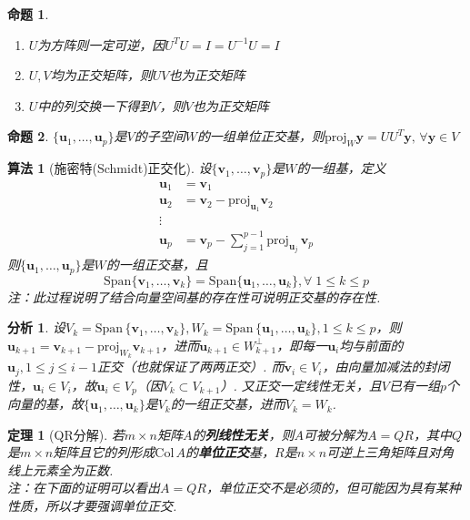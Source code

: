 \documentclass[11pt,UTF8]{ctexart}
\newtheorem{theorem}{定理}
\newtheorem{algorithm}{算法}
\newtheorem{proposition}{命题}
\newtheorem*{analysis}{分析}
\def\vy{\mathbf{y}}
\def\vv{\mathbf{v}}
\def\span{\mathrm{Span}\,}
\def\col{\mathrm{Col}\,}
\newcommand{\proj}[1]{\mathrm{proj}_{#1}}
\newcommand{\vb}[1]{\mathbf{#1}}
\begin{document}
\begin{proposition}
\begin{enumerate}
	\itemsep -3pt
	\item $U$为方阵则一定可逆，因$U^TU=I=U^{-1}U=I$
	\item $U,V$均为正交矩阵，则$UV$也为正交矩阵
	\item $U$中的列交换一下得到$V$，则$V$也为正交矩阵
\end{enumerate}
\end{proposition}
\begin{proposition}
$\{\mathbf{u}_1,\dots,\mathbf{u}_p\}$是$V$的子空间$W$的一组单位正交基，则$\proj{W}\vy=UU^T\vy,\,\forall\vy\in V$
\end{proposition}
\begin{algorithm}[施密特(Schmidt)正交化]
\label{schmidt}
设$\{\mathbf{v}_1,\dots,\mathbf{v}_p\}$是$W$的一组基，定义
\[\begin{aligned}\mathbf {u} _{1}&=\mathbf {v} _{1}\\
\mathbf {u} _{2}&=\mathbf {v} _{2}-\mathrm {proj} _{\mathbf {u} _{1}}\vv_2\\
\vdots\\
\mathbf {u} _{p}&=\mathbf {v} _{p}-\sum _{j=1}^{p-1}\mathrm {proj} _{\mathbf {u} _{j}}\,\mathbf {v} _{p}\end{aligned}\]
则$\{\mathbf{u}_1,\dots,\mathbf{u}_p\}$是$W$的一组正交基，且
\[\mathrm{Span}\{\mathbf{v}_1,\dots,\mathbf{v}_k\}=\mathrm{Span}\{\mathbf{u}_1,\dots,\mathbf{u}_k\},\forall\;1\leq k\leq p\]
注：此过程说明了结合向量空间基的存在性可说明正交基的存在性.
\end{algorithm}
\begin{analysis}
设$V_k=\span\{\mathbf{v}_1,\dots,\mathbf{v}_k\},W_k=\span\{\mathbf{u}_1,\dots,\mathbf{u}_k\},1\leq k\leq p$，则$\vb{u}_{k+1}=\vv_{k+1}-\proj{W_k}\vv_{k+1}$，进而$\vb{u}_{k+1}\in W_{k+1}^\perp$，即每一$\vb{u}_i$均与前面的$\vb{u}_j,1\leq j\leq i-1$正交（也就保证了两两正交）. 而$\vb{v}_i\in V_i$，由向量加减法的封闭性，$\vb{u}_i\in V_i$，故$\vb{u}_i\in V_p$（因$V_k\subset V_{k+1}$）. 又正交一定线性无关，且$V$已有一组$p$个向量的基，故$\{\mathbf{u}_1,\dots,\mathbf{u}_k\}$是$V_k$的一组正交基，进而$V_k=W_k$.\\
\end{analysis}
\begin{theorem}[QR分解]
\label{qr_fact}
若$m\times n$矩阵$A$的\textbf{列线性无关}，则$A$可被分解为$A=QR$，其中$Q$是$m\times n$矩阵且它的列形成$\col A$的\textbf{单位正交}基，$R$是$n\times n$可逆上三角矩阵且对角线上元素全为正数.\\
注：在下面的证明可以看出$A=QR$，单位正交不是必须的，但可能因为具有某种性质，所以才要强调单位正交.
\end{theorem}
\end{document}

